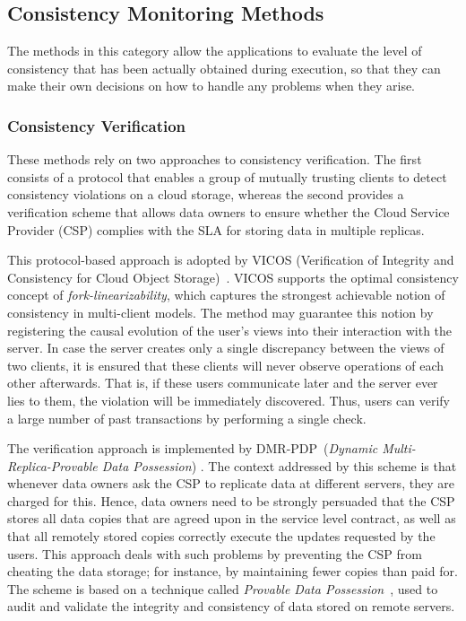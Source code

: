 \vspace{-1mm}
\subsection{Consistency Monitoring Methods}

The methods in this category  
allow the applications to evaluate the level of consistency that has been actually obtained during execution, so that they can make their own decisions on how to handle any problems when they arise. 

\subsubsection{Consistency Verification}

These methods rely on two approaches to consistency verification. The first consists of a protocol that enables a group of mutually trusting clients to detect consistency violations on a cloud storage, whereas the second provides a verification scheme that allows data owners to ensure whether the Cloud Service Provider (CSP) complies with the SLA for storing data in multiple replicas.

This protocol-based approach is adopted by VICOS (Verification of Integrity and Consistency for Cloud Object Storage)~\cite{BrandenburgerCK15}. VICOS supports the optimal con\-sist\-ency concept of \textit{fork-linearizability}, which captures the strongest achievable notion of consistency in multi-client models. The method may guarantee this notion by registering the causal evolution of the user’s views into their interaction with the server. In case the server creates only a single discrepancy between the views of two clients, it is ensured that these clients will never observe operations of each other afterwards. That is, if these users communicate later and the server ever lies to them, the violation will be immediately discovered. Thus, users can verify a large number of past transactions by performing a single check.

The verification approach is implemented by DMR-PDP~(\textit{Dynamic Multi-Replica-Pro\-vable Data Possession}) \cite{MukundanML12}. The context addressed by this scheme is that whenever data owners ask the CSP to replicate data at different servers, they are charged for this. Hence, data owners need to be strongly persuaded that the CSP stores all data copies that are agreed upon in the service level contract, as well as that all remotely stored copies correctly execute the updates requested by the users. %
This approach deals with such problems by preventing the CSP from cheating the data storage; for instance, by maintaining fewer copies than paid for. The scheme is based on a technique called \textit{Provable Data Possession}~\cite{ateniese2007provable}, used to audit and validate the integrity and consistency of data stored on remote servers.

